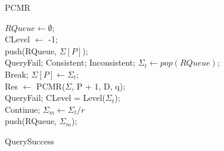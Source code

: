 \IncMargin{1em}
\begin{algorithm}\label{alg_prqa}
	{\small
		\caption{PCMR}
		$RQueue \leftarrow \emptyset$;\\
		CLevel $\leftarrow$ -1;\\
		push(RQueue, $\Sigma[P]$);\\
		{
			 {
				{
					{
						\Return QueryFail;
					}
					\Return Consistent;
				}
				\Return Inconsistent;
			}
			$\Sigma_t \leftarrow pop(RQueue)$;\\
			{
				Break;
			}			
			$\Sigma[P] \leftarrow \Sigma_t$;\\
			
			Res $\leftarrow$ PCMR($\Sigma$, P + 1, D, q);\\
			{
				\Return QueryFail;
			}
			{
				CLevel = Level($\Sigma_t$);\\
				Continue;
			}
			{
				$\Sigma_m \leftarrow \Sigma_t / r$\\
				push(RQueue, $\Sigma_m$);\\
			}  
		}
		
		\Return QuerySuccess
	}
	\vspace*{-1mm}
\end{algorithm}
\DecMargin{1em}
